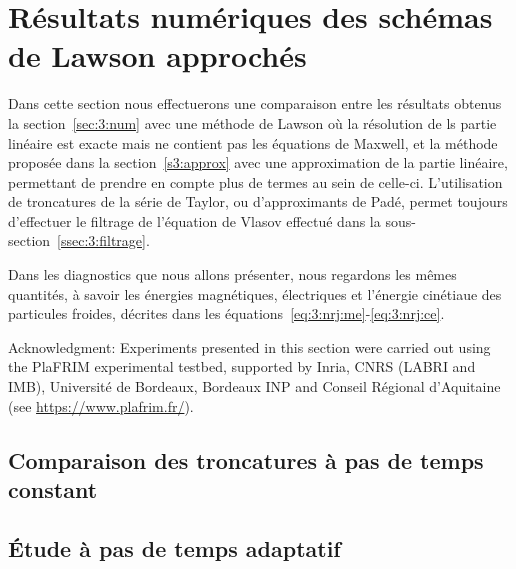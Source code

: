 
\section{Résultats numériques des schémas de Lawson approchés}

Dans cette section nous effectuerons une comparaison entre les résultats obtenus la section~\ref{sec:3:num} avec une méthode de Lawson où la résolution de ls partie linéaire est exacte mais ne contient pas les équations de Maxwell, et la méthode proposée dans la section~\ref{s3:approx} avec une approximation de la partie linéaire, permettant de prendre en compte plus de termes au sein de celle-ci. L'utilisation de troncatures de la série de Taylor, ou d'approximants de Padé, permet toujours d'effectuer le filtrage de l'équation de Vlasov effectué dans la sous-section~\ref{ssec:3:filtrage}.

Dans les diagnostics que nous allons présenter, nous regardons les mêmes quantités, à savoir les énergies magnétiques, électriques et l'énergie cinétiaue des particules froides, décrites dans les équations~\eqref{eq:3:nrj:me}-\eqref{eq:3:nrj:ce}.

\begin{otherlanguage}{english}
Acknowledgment: Experiments presented in this section were carried out using the PlaFRIM experimental testbed, supported by Inria, CNRS (LABRI and IMB), Université de Bordeaux, Bordeaux INP and Conseil Régional d’Aquitaine (see \url{https://www.plafrim.fr/}).
\end{otherlanguage}

\subsection{Comparaison des troncatures à pas de temps constant}


\subsection{Étude à pas de temps adaptatif}

